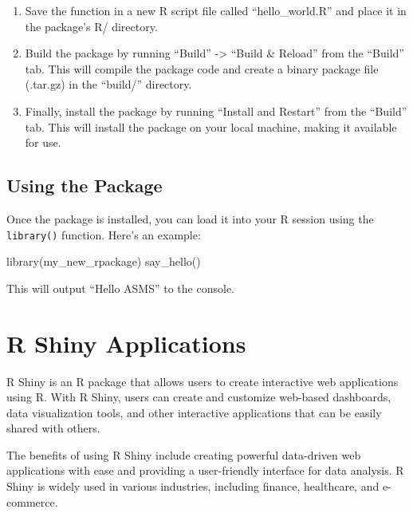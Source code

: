 \documentclass[
]{book}
\newenvironment{Shaded}{\begin{snugshade}}{\end{snugshade}}
\newcommand{\FunctionTok}[1]{\textcolor[rgb]{0.00,0.00,0.00}{#1}}
\newcommand{\NormalTok}[1]{#1}
\providecommand{\tightlist}{%
  \setlength{\itemsep}{0pt}\setlength{\parskip}{0pt}}
\begin{document}
\begin{enumerate}
\def\labelenumi{\arabic{enumi}.}
\tightlist
\item
  Save the function in a new R script file called ``hello\_world.R'' and place it in the package's R/ directory.
\item
  Build the package by running ``Build'' -\textgreater{} ``Build \& Reload'' from the ``Build'' tab. This will compile the package code and create a binary package file (.tar.gz) in the ``build/'' directory.
\item
  Finally, install the package by running ``Install and Restart'' from the ``Build'' tab. This will install the package on your local machine, making it available for use.
\end{enumerate}

\hypertarget{using-the-package}{%
\subsection*{Using the Package}\label{using-the-package}}

Once the package is installed, you can load it into your R session using the \texttt{library()} function. Here's an example:

\begin{Shaded}
\begin{Highlighting}[]
\FunctionTok{library}\NormalTok{(my\_new\_rpackage)}
\FunctionTok{say\_hello}\NormalTok{()}
\end{Highlighting}
\end{Shaded}

This will output ``Hello ASMS'' to the console.

\hypertarget{r-shiny-applications}{%
\section{R Shiny Applications}\label{r-shiny-applications}}

R Shiny is an R package that allows users to create interactive web applications using R. With R Shiny, users can create and customize web-based dashboards, data visualization tools, and other interactive applications that can be easily shared with others.

The benefits of using R Shiny include creating powerful data-driven web applications with ease and providing a user-friendly interface for data analysis. R Shiny is widely used in various industries, including finance, healthcare, and e-commerce.
\end{document}
